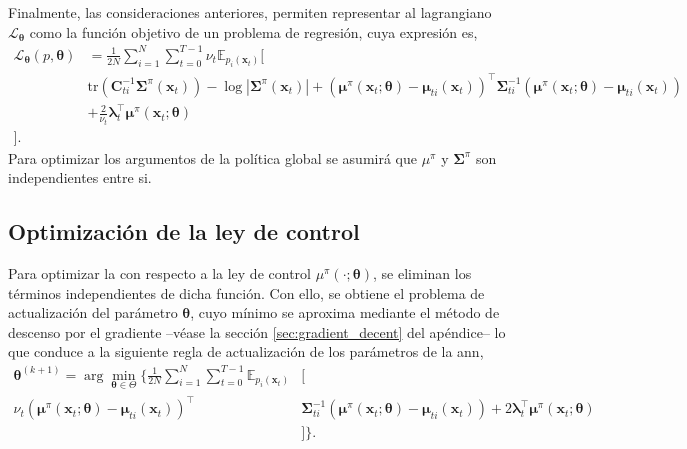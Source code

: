 Finalmente, las consideraciones anteriores, permiten representar al lagrangiano $\mathcal{L}_{\bm\theta}$ como la función objetivo de un problema de regresión, cuya expresión es,
\begin{equation}
\begin{split}
    \mathcal{L}_{\bm{\theta}}(p, \bm{\theta}) &= \frac{1}{2N}\sum_{i=1}^{N}\sum_{t=0}^{T-1} \nu_t \mathbb{E}_{p_i(\mathbf{x}_t)} \Bigg[ \\ &\text{tr}\left( \mathbf{C}_{ti}^{-1}\bm{\Sigma}^{\pi}(\mathbf{x}_t)\right) - \log\left|\bm{\Sigma}^{\pi}(\mathbf{x}_t)\right|
    + \left(\bm{\mu}^{\pi}(\mathbf{x}_t; \bm{\theta}) - \bm{\mu}_{ti}(\mathbf{x}_t) \right)^{\top} \bm{\Sigma}_{ti}^{-1} \left(\bm{\mu}^{\pi}(\mathbf{x}_t; \bm{\theta}) - \bm{\mu}_{ti}(\mathbf{x}_t) \right) \\
     & + \frac{2}{\nu_t} \bm{\lambda}_{t}^{\top}\bm{\mu}^{\pi}(\mathbf{x}_t; \bm{\theta})\\ \Bigg].
\end{split}
\label{eq:lagrange_policy}
\end{equation}
Para optimizar los argumentos de la política global se asumirá que $\mu^{\pi}$ y $\bm\Sigma^{\pi}$ son independientes entre si.

\subsection{Optimización de la ley de control}
Para optimizar la  con respecto a la ley de control $\mu^{\pi}(\cdot; \bm\theta)$, se eliminan los términos independientes de dicha función. Con ello, se obtiene el problema de actualización del parámetro $\bm\theta$, cuyo mínimo se aproxima mediante el método de descenso por el gradiente –véase la sección \ref{sec:gradient_decent} del apéndice– lo que conduce a la siguiente regla de actualización de los parámetros de la \acrshort{ann},
\begin{equation}
\begin{split}
    \bm{\theta}^{(k+1)} = \arg \min_{\bm{\theta} \in \Theta} \Bigg\{
    \frac{1}{2N} \sum_{i=1}^{N} \sum_{t=0}^{T-1} 
    \mathbb{E}_{p_i(\mathbf{x}_t)} &\Big[
    \\ \nu_t \left( \bm{\mu}^{\pi}(\mathbf{x}_t; \bm{\theta}) - \bm{\mu}_{ti}(\mathbf{x}_t) \right)^{\top} &\bm{\Sigma}_{ti}^{-1} \left( \bm{\mu}^{\pi}(\mathbf{x}_t; \bm{\theta}) - \bm{\mu}_{ti}(\mathbf{x}_t) \right)
     + 2 \bm{\lambda}_{t}^{\top} \bm{\mu}^{\pi}(\mathbf{x}_t; \bm{\theta})
    \\&\Big] \Bigg\}.
\end{split}
\label{eq:policy_theta}
\end{equation}

